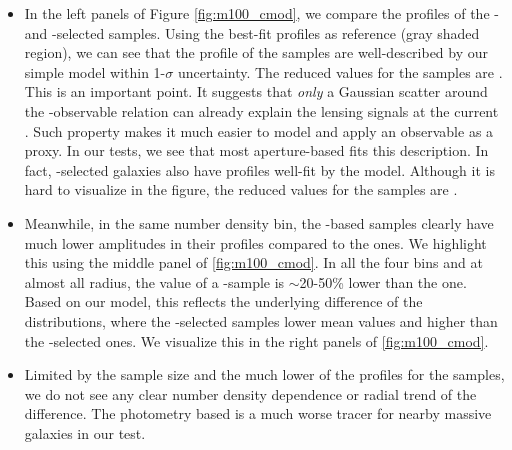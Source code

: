 \documentclass[a4paper,fleqn,usenatbib]{mnras}
\begin{document}
    \begin{itemize}

        \item In the left panels of Figure \ref{fig:m100_cmod}, we compare the \rdsigma{} profiles
            of the \mcmodel{}- and -selected samples.
            Using the best-fit profiles as reference (gray shaded region), we can see that the
            \dsigma{} profile of the  samples are well-described by our simple model
            within 1-$\sigma$ uncertainty.
            The reduced \chisq{} values for the \maper{} samples are \todo{[XX, XX, XX, XX]}.
            This is an important point. It suggests that \emph{only} a Gaussian scatter around
            the \mvir{}-observable relation can already explain the lensing signals at
            the current \snratio{}.
            Such property makes it much easier to model and apply an observable as a \mvir{} proxy.
            In our tests, we see that most aperture-based \mstar{} fits this description.
            In fact, \cmodel{}-selected galaxies also have \dsigma{} profiles well-fit by the model.
            Although it is hard to visualize in the figure, the reduced \chisq{} values for the
            \mcmodel{} samples are \todo{[XX, XX, XX, XX]}.

        \item Meanwhile, in the same number density bin, the \mcmodel{}-based samples clearly have
            much lower amplitudes in their \dsigma{} profiles compared to the  ones.
            We highlight this using the middle panel of \ref{fig:m100_cmod}.
            In all the four bins and at almost all radius, the \dsigma{} value of a \mcmodel{}-sample
            is $\sim$20-50\% lower than the  one.
            Based on our model, this reflects the underlying difference of the \mvir{} distributions,
            where the \mcmodel{}-selected samples lower mean \mvir{} values and higher \sighalo{}
            than the -selected ones.
            We visualize this in the right panels of \ref{fig:m100_cmod}.

        \item Limited by the sample size and the much lower \snratio{} of the \dsigma{} profiles
            for the \mcmodel{} samples, we do not see any clear number density dependence or radial
            trend of the difference.
            The \cmodel{} photometry based \mstar{} is a much worse \mvir{} tracer for nearby
            massive galaxies in our test.


\end{itemize}
\end{document}
